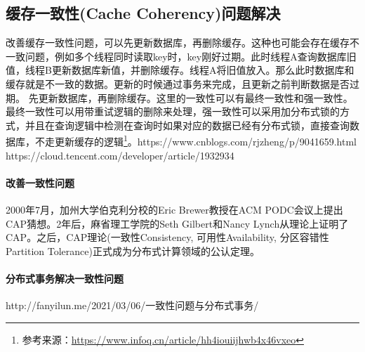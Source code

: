 \documentclass[../../../interview-questions.tex]{subfiles}
\begin{document}
\subsection{缓存一致性(Cache Coherency)问题解决}

改善缓存一致性问题，可以先更新数据库，再删除缓存。这种也可能会存在缓存不一致问题，例如多个线程同时读取key时，key刚好过期。此时线程A查询数据库旧值，线程B更新数据库新值，并删除缓存。线程A将旧值放入。那么此时数据库和缓存就是不一致的数据。更新的时候通过事务来完成，且更新之前判断数据是否过期。
先更新数据库，再删除缓存。这里的一致性可以有最终一致性和强一致性。最终一致性可以用带重试逻辑的删除来处理，强一致性可以采用加分布式锁的方式，并且在查询逻辑中检测在查询时如果对应的数据已经有分布式锁，直接查询数据库，不走更新缓存的逻辑\footnote{参考来源：\url{https://www.infoq.cn/article/hh4iouiijhwb4x46vxeo}}。https://www.cnblogs.com/rjzheng/p/9041659.html
https://cloud.tencent.com/developer/article/1932934

\paragraph{改善一致性问题}

2000年7月，加州大学伯克利分校的Eric Brewer教授在ACM PODC会议上提出CAP猜想。2年后，麻省理工学院的Seth Gilbert和Nancy Lynch从理论上证明了CAP。之后，CAP理论(一致性Consistency, 可用性Availability, 分区容错性Partition Tolerance)正式成为分布式计算领域的公认定理。

\paragraph{分布式事务解决一致性问题}

http://fanyilun.me/2021/03/06/一致性问题与分布式事务/
\end{document}
